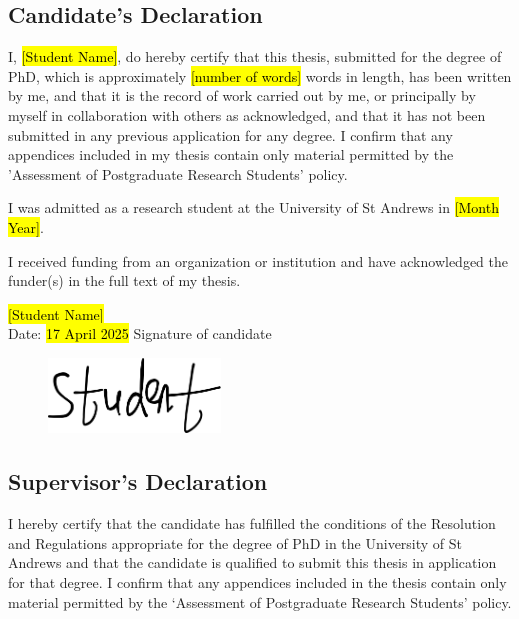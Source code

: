 \begin{declaration}
\subsection*{Candidate's Declaration}
I, \hl{[Student Name]}, do hereby certify that this thesis, submitted for the degree of PhD, which is approximately \hl{[number of words]} words in length, has been written by me, and that it is the record of work carried out by me, or principally by myself in collaboration with others as acknowledged, and that it has not been submitted in any previous application for any degree. I confirm that any appendices included in my thesis contain only material permitted by the 'Assessment of Postgraduate Research Students' policy.

I was admitted as a research student at the University of St Andrews in \hl{[Month Year]}. %

I received funding from an organization or institution and have acknowledged the funder(s) in the full text of my thesis.
\vspace{24pt}

\hspace{13em}\hl{[Student Name]}\\
Date: \hl{17 April 2025} \hspace{4em} Signature of candidate
\vspace{-2.0cm}
\begin{figure}[H]
\hspace{25em}
\includegraphics[height=2cm]{prologue/signatures/student-sig.png}
\end{figure}


\subsection*{Supervisor's Declaration}
I hereby certify that the candidate has fulfilled the conditions of the Resolution and Regulations appropriate for the degree of PhD in the University of St Andrews and
that the candidate is qualified to submit this thesis in application for that degree. I confirm that any appendices included in the thesis contain only material permitted by the `Assessment of Postgraduate Research Students' policy.
\vspace{24pt}


\end{declaration}
